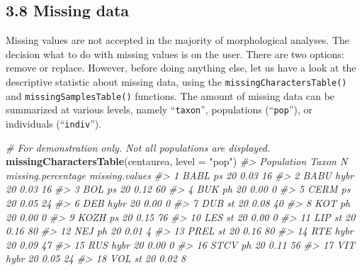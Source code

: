 \documentclass[
]{article}
\newenvironment{Shaded}{\begin{snugshade}}{\end{snugshade}}
\newcommand{\CommentTok}[1]{\textcolor[rgb]{0.56,0.35,0.01}{\textit{#1}}}
\newcommand{\DataTypeTok}[1]{\textcolor[rgb]{0.13,0.29,0.53}{#1}}
\newcommand{\KeywordTok}[1]{\textcolor[rgb]{0.13,0.29,0.53}{\textbf{#1}}}
\newcommand{\NormalTok}[1]{#1}
\newcommand{\StringTok}[1]{\textcolor[rgb]{0.31,0.60,0.02}{#1}}
\begin{document}
\hypertarget{missing-data}{%
\subsection{3.8 Missing data}\label{missing-data}}

Missing values are not accepted in the majority of morphological
analyses. The decision what to do with missing values is on the user.
There are two options: remove or replace. However, before doing anything
else, let us have a look at the descriptive statistic about missing
data, using the \texttt{missingCharactersTable()} and
\texttt{missingSamplesTable()} functions. The amount of missing data can
be summarized at various levels, namely ``\texttt{taxon}'', populations
(``\texttt{pop}''), or individuals (``\texttt{indiv}'').

\begin{Shaded}
\begin{Highlighting}[]
\CommentTok{# For demonstration only. Not all populations are displayed.}
\KeywordTok{missingCharactersTable}\NormalTok{(centaurea, }\DataTypeTok{level =} \StringTok{"pop"}\NormalTok{)}
\CommentTok{#>    Population Taxon  N missing.percentage missing.values}
\CommentTok{#> 1        BABL    ps 20               0.03             16}
\CommentTok{#> 2        BABU  hybr 20               0.03             16}
\CommentTok{#> 3         BOL    ps 20               0.12             60}
\CommentTok{#> 4         BUK    ph 20               0.00              0}
\CommentTok{#> 5        CERM    ps 20               0.05             24}
\CommentTok{#> 6         DEB  hybr 20               0.00              0}
\CommentTok{#> 7         DUB    st 20               0.08             40}
\CommentTok{#> 8         KOT    ph 20               0.00              0}
\CommentTok{#> 9        KOZH    ps 20               0.15             76}
\CommentTok{#> 10        LES    st 20               0.00              0}
\CommentTok{#> 11        LIP    st 20               0.16             80}
\CommentTok{#> 12        NEJ    ph 20               0.01              4}
\CommentTok{#> 13       PREL    st 20               0.16             80}
\CommentTok{#> 14        RTE  hybr 20               0.09             47}
\CommentTok{#> 15        RUS  hybr 20               0.00              0}
\CommentTok{#> 16       STCV    ph 20               0.11             56}
\CommentTok{#> 17        VIT  hybr 20               0.05             24}
\CommentTok{#> 18        VOL    st 20               0.02              8}
\end{Highlighting}
\end{Shaded}
\end{document}
